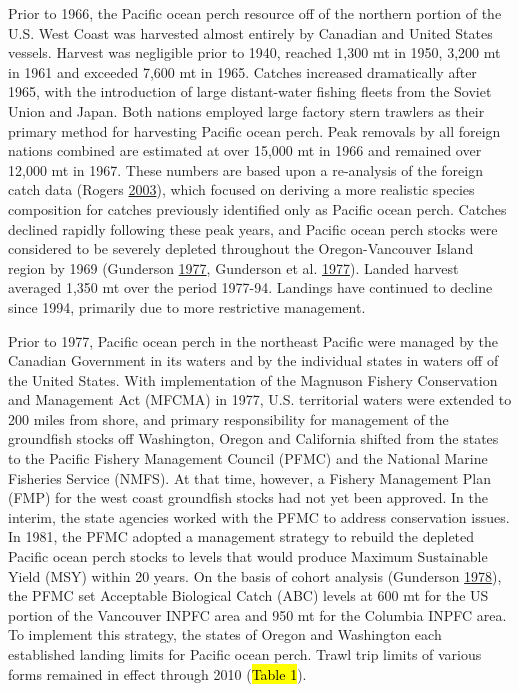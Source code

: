 \documentclass[12pt,]{article}
\begin{document}
Prior to 1966, the Pacific ocean perch resource off of the northern
portion of the U.S. West Coast was harvested almost entirely by Canadian
and United States vessels. Harvest was negligible prior to 1940, reached
1,300 mt in 1950, 3,200 mt in 1961 and exceeded 7,600 mt in 1965.
Catches increased dramatically after 1965, with the introduction of
large distant-water fishing fleets from the Soviet Union and Japan. Both
nations employed large factory stern trawlers as their primary method
for harvesting Pacific ocean perch. Peak removals by all foreign nations
combined are estimated at over 15,000 mt in 1966 and remained over
12,000 mt in 1967. These numbers are based upon a re-analysis of the
foreign catch data (Rogers
\protect\hyperlink{ref-rogers_species_2003}{2003}), which focused on
deriving a more realistic species composition for catches previously
identified only as Pacific ocean perch. Catches declined rapidly
following these peak years, and Pacific ocean perch stocks were
considered to be severely depleted throughout the Oregon-Vancouver
Island region by 1969 (Gunderson
\protect\hyperlink{ref-gunderson_population_1977}{1977}, Gunderson et
al. \protect\hyperlink{ref-gunderson_status_1977}{1977}). Landed harvest
averaged 1,350 mt over the period 1977-94. Landings have continued to
decline since 1994, primarily due to more restrictive management.

Prior to 1977, Pacific ocean perch in the northeast Pacific were managed
by the Canadian Government in its waters and by the individual states in
waters off of the United States. With implementation of the Magnuson
Fishery Conservation and Management Act (MFCMA) in 1977, U.S.
territorial waters were extended to 200 miles from shore, and primary
responsibility for management of the groundfish stocks off Washington,
Oregon and California shifted from the states to the Pacific Fishery
Management Council (PFMC) and the National Marine Fisheries Service
(NMFS). At that time, however, a Fishery Management Plan (FMP) for the
west coast groundfish stocks had not yet been approved. In the interim,
the state agencies worked with the PFMC to address conservation issues.
In 1981, the PFMC adopted a management strategy to rebuild the depleted
Pacific ocean perch stocks to levels that would produce Maximum
Sustainable Yield (MSY) within 20 years. On the basis of cohort analysis
(Gunderson \protect\hyperlink{ref-gunderson_results_1978}{1978}), the
PFMC set Acceptable Biological Catch (ABC) levels at 600 mt for the US
portion of the Vancouver INPFC area and 950 mt for the Columbia INPFC
area. To implement this strategy, the states of Oregon and Washington
each established landing limits for Pacific ocean perch. Trawl trip
limits of various forms remained in effect through 2010 (\hl{Table 1}).
\end{document}
